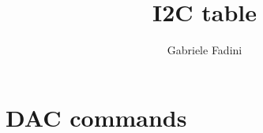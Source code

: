 \documentclass{article}
\title{I2C table}
\author{Gabriele Fadini}
\begin{document}
\maketitle

\iffalse
                Cristiano Fontana
                Caen sys -> detector PI del progetto
                Riunione Enea waste management as decommissioning
                Sogin
                Nucleco
                Finocchiaro

                Marco Ripani

                Rivelatori prodotti commerciali o no
                Dragon
                Ansaldo -> droni UGV da terra
                Manipolatori e strumentazione

                Hot cell
                Deposito 
                Ambiente ostile
                Radiation harness (per elettricità)
                Non sanno cosa ci sia dentro alle centrali
                Teleguidato

                Droni per grandi pareti verticali e mappare camini, noccioli, mappatura volante di lunghezza variabile


                700g 

                Supporto in alluminio
                O plastica sa stl
                **Telaio**
                + Robusto e certificato
                + dji
                + Matrice 600 (s600 o s900)
                + Medesimo controllore

                Brevetto volo sotto 4kg

                Enac

                Prove simulando carico
                Cuscino gonfiabile
\fi

\section{DAC commands}
\end{document}
